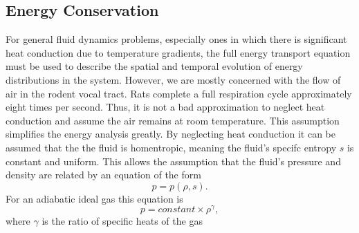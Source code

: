 \documentclass[12pt, letter]{report}
\begin{document}
\subsection{Energy Conservation}
For general fluid dynamics problems, especially ones in which there is significant heat conduction due to temperature gradients, the full energy transport equation must be used to describe the spatial and temporal evolution of energy distributions in the system. However, we are mostly concerned with the flow of air in the rodent vocal tract. Rats complete a full respiration cycle approximately eight times per second. Thus, it is not a bad approximation to neglect heat conduction and assume the air remains at room temperature. This assumption simplifies the energy analysis greatly. By neglecting heat conduction it can be assumed that the the fluid is homentropic, meaning the fluid's specifc entropy $s$ is constant and uniform. This allows the assumption that the fluid's pressure and density are related by an equation of the form
\begin{equation}
p = p(\rho, s).
\end{equation}
For an adiabatic ideal gas this equation is
\begin{equation}
p = constant \times \rho^\gamma,
\end{equation}
where $\gamma$ is the ratio of specific heats of the gas
\end{document}
